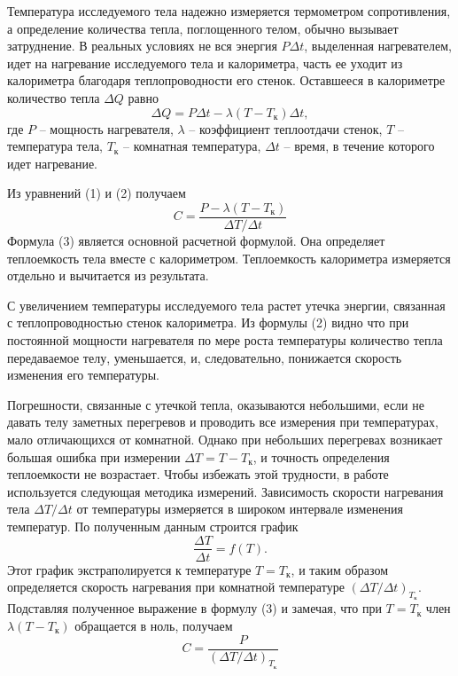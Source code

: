 \documentclass[a4paper, 12pt]{article}
\begin{document}
Температура исследуемого тела надежно измеряется термометром сопротивления, а определение количества тепла, поглощенного телом, обычно вызывает затруднение. В реальных условиях не вся энергия $P \Delta t$, выделенная нагревателем, идет на нагревание исследуемого тела и калориметра, часть ее уходит из калориметра благодаря теплопроводности его стенок. Оставшееся в калориметре количество тепла $\Delta Q$ равно 
\begin{equation}
	\Delta Q = P\Delta t - \lambda(T - T_{\text{к}}) \Delta t,
	\label{eq:dQ}
\end{equation}
где $P$ -- мощность нагревателя, $\lambda$ -- коэффициент теплоотдачи стенок, $T$ -- температура тела, $T_{\text{к}}$ -- комнатная температура, $ \Delta t$ -- время, в течение которого идет нагревание.

Из уравнений (1) и (2) получаем
\begin{equation}
	C = \frac{P - \lambda(T - T_{\text{к}})}{\Delta T / \Delta t}
	\label{osnovnaya}
\end{equation}
Формула (3) является основной расчетной формулой. Она определяет теплоемкость тела вместе с калориметром. Теплоемкость калориметра измеряется отдельно и вычитается из результата.

С увеличением температуры исследуемого тела растет утечка энергии, связанная с теплопроводностью стенок калориметра. Из формулы (2) видно что при постоянной мощности нагревателя по мере роста температуры количество тепла передаваемое телу, уменьшается, и, следовательно, понижается скорость изменения его температуры.

Погрешности, связанные с утечкой тепла, оказываются небольшими, если не давать телу заметных перегревов и проводить все измерения при температурах, мало отличающихся от комнатной. Однако при небольших перегревах возникает большая ошибка при измерении $\Delta T = T - T_\text{к}$, и точность определения теплоемкости не возрастает. Чтобы избежать этой трудности, в работе используется следующая методика измерений. Зависимость скорости нагревания тела $\Delta T / \Delta t$ от температуры измеряется в широком интервале изменения температур. По полученным данным строится график
\begin{equation*}
	\frac{\Delta T}{\Delta t} = f(T).
\end{equation*}
Этот график экстраполируется к температуре $T = T_{\text{к}}$, и таким образом определяется скорость нагревания при комнатной температуре $(\Delta T / \Delta t)_{T_{\text{к}}}$. Подставляя полученное выражение в формулу (3) и замечая, что при $T = T_{\text{к}}$ член $\lambda(T - T_{\text{к}})$ обращается в ноль, получаем
\begin{equation}
	C = \frac{P}{(\Delta T / \Delta t)_{T_{\text{к}}}}
	\label{4}
\end{equation}
\end{document}
